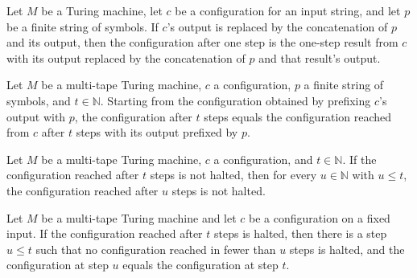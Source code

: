 \begin{theorem}
\label{Turing.MultiTapeTM.step_output_prepend}
\leanok
{}
Let $M$ be a Turing machine, let $c$ be a configuration for an input string, and let $p$
be a finite string of symbols. If $c$'s output is replaced by the concatenation of $p$
and its output, then the configuration after one step is the one-step result from $c$
with its output replaced by the concatenation of $p$ and that result's output.
\end{theorem}

\begin{theorem}
\label{Turing.MultiTapeTM.runFrom_output_prepend}
\leanok
{}
Let $M$ be a multi-tape Turing machine, $c$ a configuration, $p$ a finite string of
symbols, and $t\in\mathbb{N}$. Starting from the configuration obtained by prefixing
$c$'s output with $p$, the configuration after $t$ steps equals the configuration
reached from $c$ after $t$ steps with its output prefixed by $p$.
\end{theorem}

\begin{theorem}
\label{Turing.MultiTapeTM.runFrom_state_ne_none_of_le}
\leanok
{}
Let $M$ be a multi-tape Turing machine, $c$ a configuration, and $t\in\mathbb{N}$. If
the configuration reached after $t$ steps is not halted, then for every $u\in\mathbb{N}$
with $u\le t$, the configuration reached after $u$ steps is not halted.
\end{theorem}

\begin{theorem}
\label{Turing.MultiTapeTM.exists_first_halt}
\leanok
{}
Let $M$ be a multi-tape Turing machine and let $c$ be a configuration on a fixed input.
If the configuration reached after $t$ steps is halted, then there is a step $u \le t$
such that no configuration reached in fewer than $u$ steps is halted, and the
configuration at step $u$ equals the configuration at step $t$.
\end{theorem}

